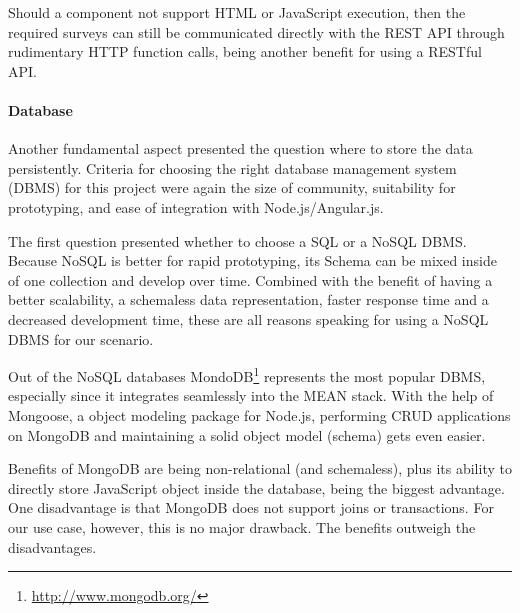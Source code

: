 
		Should a component not support HTML or JavaScript execution, then the required surveys can still be communicated directly with the REST API through rudimentary HTTP function calls, being another benefit for using a RESTful API.






	\paragraph{Database}

		Another fundamental aspect presented the question where to store the data persistently. Criteria for choosing the right database management system (DBMS) for this project were again the size of community, suitability for prototyping, and ease of integration with Node.js/Angular.js.

		The first question presented whether to choose a SQL or a NoSQL DBMS. Because NoSQL is better for rapid prototyping, its Schema can be mixed inside of one collection and develop over time. Combined with the benefit of having a better scalability, a schemaless data representation, faster response time and a decreased development time\cite{vaish2013getting}, these are all reasons speaking for using a NoSQL DBMS for our scenario. 

		Out of the NoSQL databases MondoDB\footnote{\url{http://www.mongodb.org/}} represents the most popular DBMS, especially since it integrates seamlessly into the MEAN stack. With the help of Mongoose, a object modeling package for Node.js, performing CRUD applications on MongoDB and maintaining a solid object model (schema) gets even easier.

		Benefits of MongoDB are being non-relational (and schemaless), plus its ability to directly store JavaScript object inside the database, being the biggest advantage. One disadvantage is that MongoDB does not support joins or transactions. For our use case, however, this is no major drawback. The benefits outweigh the disadvantages.



